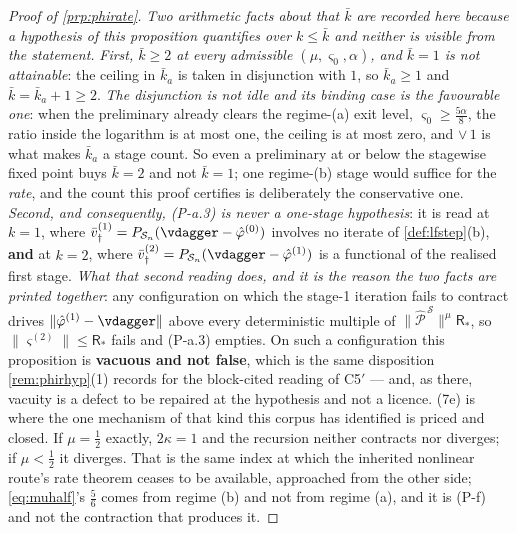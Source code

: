 \begin{proof}[Proof of \cref{prp:phirate}]
\emph{Two arithmetic facts about that $\bar k$ are recorded here because a hypothesis of this
proposition quantifies over $k\le\bar k$ and neither is visible from the statement.} \emph{First,
$\bar k\ge2$ at every admissible $(\mu,\varsigma_0,\alpha)$, and $\bar k=1$ is not attainable}: the
ceiling in $\bar k_a$ is taken in disjunction with $1$, so $\bar k_a\ge1$ and $\bar k=\bar k_a+1\ge2$.
\emph{The disjunction is not idle and its binding case is the favourable one}: when the preliminary
already clears the regime-(a) exit level, $\varsigma_0\ge\tfrac{5\alpha}{8}$, the ratio inside the
logarithm is at most one, the ceiling is at most zero, and $\vee\,1$ is what makes $\bar k_a$ a stage
count. So even a preliminary at or below the stagewise fixed point buys $\bar k=2$ and not $\bar k=1$;
one regime-(b) stage would suffice for the \emph{rate}, and the count this proof certifies is
deliberately the conservative one. \emph{Second, and consequently, (P-a.3) is never a one-stage
hypothesis}: it is read at $k=1$, where $\bar v^{(1)}_\dagger=P_{\mathcal S_n}(\vdagger-\hat\varphi^{(0)})$
involves no iterate of \cref{def:lfstep}\textup{(b)}, \textbf{and} at $k=2$, where
$\bar v^{(2)}_\dagger=P_{\mathcal S_n}(\vdagger-\hat\varphi^{(1)})$ is a functional of the realised first
stage. \emph{What that second reading does, and it is the reason the two facts are printed together}:
any configuration on which the stage-1 iteration fails to contract drives
$\|\hat\varphi^{(1)}-\vdagger\|$ above every deterministic multiple of
$\|\hat{\mathcal P}^{\,\mathcal S}\|^{\mu}\mathsf R_\ast$,
so $\|\varsigma^{(2)}\|\le\mathsf R_\ast$ fails and (P-a.3) empties. On such a
configuration this proposition is \textbf{vacuous and not false}, which is the same disposition
\cref{rem:phirhyp}\textup{(1)} records for the block-cited reading of C5$'$ --- and, as there, vacuity
is a defect to be repaired at the hypothesis and not a licence.
\textup{(7e)} is where the one mechanism of that kind this corpus has identified is
priced and closed.
If $\mu=\tfrac12$ exactly, $2\kappa=1$ and the recursion neither contracts nor diverges; if
$\mu<\tfrac12$ it diverges. That is the same index at which the inherited nonlinear route's rate
theorem ceases to be available, approached from the other side; \eqref{eq:muhalf}'s $\tfrac56$ comes
from regime (b) and not from regime (a), and it is (P-f) and not the contraction that produces it.


\end{proof}
